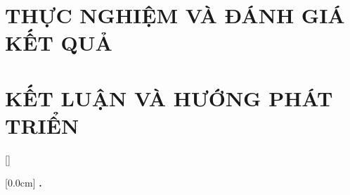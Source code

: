 \documentclass[a4paper,13pt,3p,twoside]{report}
\renewcommand{\bibname}{Danh_sach_tai_lieu_tham_khao}
\theoremstyle{definition}
\begin{document}
\newpage
\chapter{THỰC NGHIỆM VÀ ĐÁNH GIÁ KẾT QUẢ} %
\label{chapter:Experiment}


\newpage
\chapter{KẾT LUẬN VÀ HƯỚNG PHÁT TRIỂN} %
\label{chapter:conclusion}


\newpage
% 


\newpage
\renewcommand\bibname{TÀI LIỆU THAM KHẢO}
\printbibliography
{}



{}[]
\titlespacing*{\chapter}{0pt}{-20pt}{20pt}

    [0.0cm]             %
    {\bfseries\vspace{0.3cm}}                  %
    {{\bfseries{\scshape} \thecontentslabel.\ }} %
    {}         %
    {\contentspage}         %

\newpage
\end{document}
